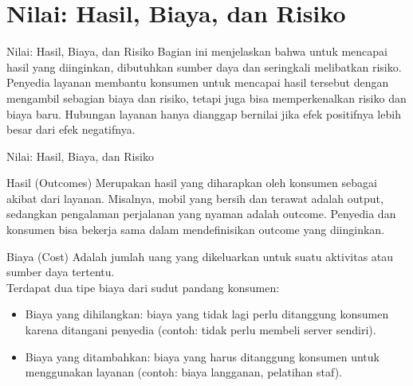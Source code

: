 \documentclass[aspectratio=179]{beamer}
\begin{document}
\section{Nilai: Hasil, Biaya, dan Risiko}
\begin{frame}{Nilai: Hasil, Biaya, dan Risiko}
    Bagian ini menjelaskan bahwa untuk mencapai hasil yang diinginkan, dibutuhkan sumber daya dan seringkali melibatkan risiko. Penyedia layanan membantu konsumen untuk mencapai hasil tersebut dengan mengambil sebagian biaya dan risiko, tetapi juga bisa memperkenalkan risiko dan biaya baru. Hubungan layanan hanya dianggap bernilai jika efek positifnya lebih besar dari efek negatifnya.
\end{frame}

\begin{frame}{Nilai: Hasil, Biaya, dan Risiko}
    \begin{block}{Hasil (Outcomes)}
        Merupakan hasil yang diharapkan oleh konsumen sebagai akibat dari layanan. Misalnya, mobil yang bersih dan terawat adalah output, sedangkan pengalaman perjalanan yang nyaman adalah outcome. Penyedia dan konsumen bisa bekerja sama dalam mendefinisikan outcome yang diinginkan.
    \end{block}
    \begin{block}{Biaya (Cost)}
        Adalah jumlah uang yang dikeluarkan untuk suatu aktivitas atau sumber daya tertentu.\\
        Terdapat dua tipe biaya dari sudut pandang konsumen:
        \begin{itemize}
            \item Biaya yang dihilangkan: biaya yang tidak lagi perlu ditanggung konsumen karena ditangani penyedia (contoh: tidak perlu membeli server sendiri).
            \item Biaya yang ditambahkan: biaya yang harus ditanggung konsumen untuk menggunakan layanan (contoh: biaya langganan, pelatihan staf).
        \end{itemize}
    \end{block}
\end{frame}
\end{document}
